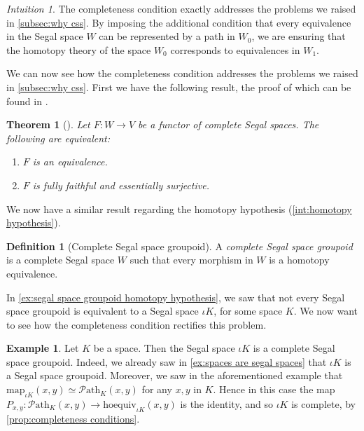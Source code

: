 \documentclass[11pt, a4paper]{amsart}
\newcommand{\map}{\mathrm{map}}
\newcommand{\hoequiv}{\mathrm{hoequiv}}
\newcommand{\Path}{\mathscr{P}\mathrm{ath}}
\newtheorem{theorem}[equation]{Theorem}
\theoremstyle{definition}
\newtheorem{definition}[equation]{Definition}
\newtheorem{example}[equation]{Example}
\theoremstyle{remark}
\newtheorem{intuition}[equation]{Intuition}
\numberwithin{equation}{section}
\begin{document}
 \begin{intuition} \label{int:css}
  The completeness condition exactly addresses the problems we raised in \cref{subsec:why css}. By imposing the additional condition that every equivalence in the Segal space $W$ can be represented by a path in $W_0$, we are ensuring that the homotopy theory of the space $W_0$ corresponds to equivalences in $W_1$. 
\end{intuition}
 
We can now see how the completeness condition addresses the problems we raised in \cref{subsec:why css}. First we have the following result, the proof of which can be found in \cite{rezk2001css}.

\begin{theorem}[{\cite[Proposition 7.6]{rezk2001css}}]
  Let $F\colon W \to V$ be a functor of complete Segal spaces. The following are equivalent:
  \begin{enumerate}
   \item $F$ is an equivalence.
   \item $F$ is fully faithful and essentially surjective.
  \end{enumerate}
\end{theorem}

We now have a similar result regarding the homotopy hypothesis (\cref{int:homotopy hypothesis}).

\begin{definition}[Complete Segal space groupoid] \label{def:complete segal space groupoid}
  A \emph{complete Segal space groupoid} is a complete Segal space $W$ such that every morphism in $W$ is a homotopy equivalence.
\end{definition}

In \cref{ex:segal space groupoid homotopy hypothesis}, we saw that not every Segal space groupoid is equivalent to a Segal space $\iota K$, for some space $K$. We now want to see how the completeness condition rectifies this problem.

\begin{example} \label{ex:space complete}
  Let $K$ be a space. Then the Segal space $\iota K$ is a complete Segal space groupoid. Indeed, we already saw in \cref{ex:spaces are segal spaces} that $\iota K$ is a Segal space groupoid. Moreover, we saw in the aforementioned example that $\map_{\iota K}(x,y) \simeq \Path_{K}(x,y)$ for any $x,y$ in $K$. Hence in this case the map $P_{x,y}\colon \Path_{K}(x,y) \to \hoequiv_{\iota K}(x,y)$ is the identity, and so $\iota K$ is complete, by \cref{prop:completeness conditions}.
\end{example}
\end{document}
